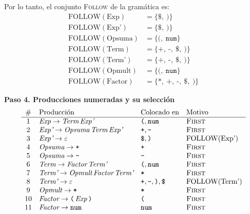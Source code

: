 \documentclass[12pt,letterpaper]{article}
\newcommand{\nt}[1]{\textit{#1}}
\newcommand{\tk}[1]{\texttt{#1}}
\newcommand{\tx}[1]{\text{#1}}
\newcommand{\Follow}[1]{\mathrm{FOLLOW}(#1)}
\newcommand{\eps}{\varepsilon}
\begin{document}
\begin{enumerate}[label=\arabic*.]
\begin{itemize}
    Por lo tanto, el conjunto \textsc{Follow} de la gramática es:
    \[
    \begin{aligned}
      \Follow{\tx{Exp}}    &= \{\tk{\$},\ \tk{)}\} \\
      \Follow{\tx{Exp'}}   &= \{\tk{\$},\ \tk{)}\} \\
      \Follow{\tx{Opsuma}} &= \{\tk{(},\ \tk{num}\} \\
      \Follow{\tx{Term}}   &= \{\tk{+},\ \tk{-},\ \tk{\$},\ \tk{)}\} \\
      \Follow{\tx{Term'}}  &= \{\tk{+},\ \tk{-},\ \tk{\$},\ \tk{)}\} \\
      \Follow{\tx{Opmult}} &= \{\tk{(},\ \tk{num}\} \\
      \Follow{\tx{Factor}} &= \{\tk{*},\ \tk{+},\ \tk{-},\ \tk{\$},\ \tk{)}\}
    \end{aligned}
    \]

    \bigskip
    
    \textbf{Paso 4. Producciones numeradas y su selección}
    \[
    \begin{array}{c l l l}
      \# & \text{Producción} & \text{Colocado en} & \text{Motivo} \\ \hline
      1  & \nt{Exp}\to\nt{Term}\,\nt{Exp'} & \tk{(},\tk{num} & \text{\textsc{First}} \\
      2  & \nt{Exp'}\to\nt{Opsuma}\,\nt{Term}\,\nt{Exp'} & \tk{+},\tk{-} & \text{\textsc{First}} \\
      3  & \nt{Exp'}\to\eps & \tk{\$},\tk{)} & \Follow{\tx{Exp'}} \\
      4  & \nt{Opsuma}\to\tk{+} & \tk{+} & \text{\textsc{First}} \\
      5  & \nt{Opsuma}\to\tk{-} & \tk{-} & \text{\textsc{First}} \\
      6  & \nt{Term}\to\nt{Factor}\,\nt{Term'} & \tk{(},\tk{num} & \text{\textsc{First}} \\
      7  & \nt{Term'}\to\nt{Opmult}\,\nt{Factor}\,\nt{Term'} & \tk{*} & \text{\textsc{First}} \\
      8  & \nt{Term'}\to\eps & \tk{+},\tk{-},\tk{)},\tk{\$} & \Follow{\tx{Term'}} \\
      9  & \nt{Opmult}\to\tk{*} & \tk{*} & \text{\textsc{First}} \\
      10 & \nt{Factor}\to\tk{(}\,\nt{Exp}\,\tk{)} & \tk{(} & \text{\textsc{First}} \\
      11 & \nt{Factor}\to\tk{num} & \tk{num} & \text{\textsc{First}}
    \end{array}
    \]


\end{itemize}
\end{enumerate}
\end{document}
